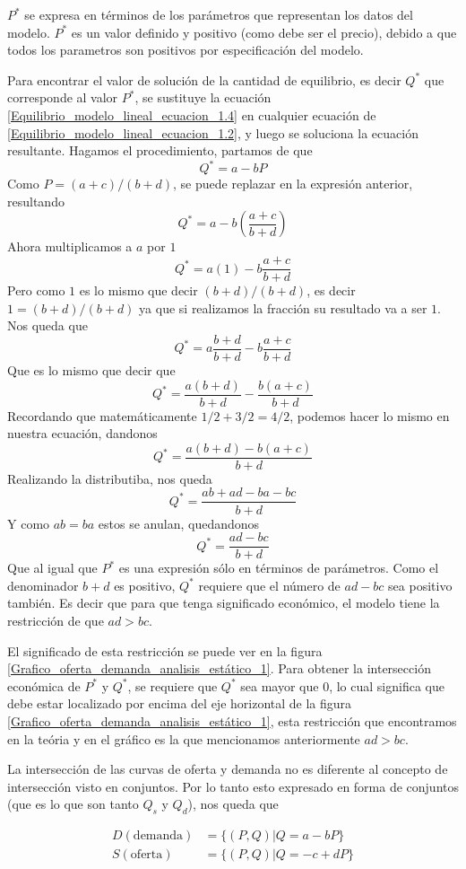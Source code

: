 \(P^\ast\) se expresa en términos de los parámetros que representan los datos del modelo. \(P^\ast\) es un valor definido y positivo (como debe ser el precio), debido a que todos los parametros son positivos por especificación del modelo.

Para encontrar el valor de solución de la cantidad de equilibrio, es decir \(Q^\ast\) que corresponde al valor \(P^\ast\), se sustituye la ecuación \ref{Equilibrio_modelo_lineal_ecuacion_1.4} en cualquier ecuación de \ref{Equilibrio_modelo_lineal_ecuacion_1.2}, y luego se soluciona la ecuación resultante. Hagamos el procedimiento, partamos de que 
\[
    Q^\ast=a-bP
\]
Como \(P = (a+c)/(b+d)\), se puede replazar en la expresión anterior, resultando
\[
Q^\ast=a-b(\frac{a+c}{b+d})
\]
Ahora multiplicamos a \(a\) por \(1\)
\[
Q^\ast=a(1)-b\frac{a+c}{b+d}
\]
Pero como \(1\) es lo mismo que decir \((b+d)/(b+d)\), es decir \(1=(b+d)/(b+d)\) ya que si realizamos la fracción su resultado va a ser \(1\). Nos queda que 
\[
Q^\ast=a\frac{b+d}{b+d}-b\frac{a+c}{b+d}
\]
Que es lo mismo que decir que 
\[
Q^\ast= \frac{a(b+d)}{b+d}-\frac{b(a+c)}{b+d}
\]
Recordando que matemáticamente \(1/2 + 3/2 = 4/2\), podemos hacer lo mismo en nuestra ecuación, dandonos 
\[
Q^\ast= \frac{a(b+d)-b(a+c)}{b+d}
\]
Realizando la distributiba, nos queda 
\[
Q^\ast= \frac{ab+ad-ba-bc}{b+d}
\]
Y como \(ab = ba\) estos se anulan, quedandonos 
\[
Q^\ast= \frac{ad-bc}{b+d}
\]
Que al igual que \(P^\ast\) es una expresión sólo en términos de parámetros. Como el denominador \(b+d\) es positivo, \(Q^\ast\) requiere que el número de \(ad-bc\) sea positivo también. Es decir que para que tenga significado económico, el modelo tiene la restricción de que \(ad>bc\).

El significado de esta restricción se puede ver en la figura \ref{Grafico_oferta_demanda_analisis_estático_1}. Para obtener la intersección económica de \(P^\ast\) y \(Q^\ast\), se requiere que \(Q^\ast\) sea mayor que \(0\), lo cual significa que debe estar localizado por encima del eje horizontal de la figura \ref{Grafico_oferta_demanda_analisis_estático_1}, esta restricción que encontramos en la teória y en el gráfico es la que mencionamos anteriormente \(ad>bc\).

La intersección de las curvas de oferta y demanda no es diferente al concepto de intersección visto en conjuntos. Por lo tanto esto expresado en forma de conjuntos (que es lo que son tanto \(Q_s\) y \(Q_d\)), nos queda que

\begin{equation}
    \begin{aligned}
    D (\text{demanda}) &= \{(P,Q) | Q = a - bP\} \\
    S (\text{oferta}) &= \{(P,Q) | Q = -c + dP\} \\
    \end{aligned}
\end{equation} 


